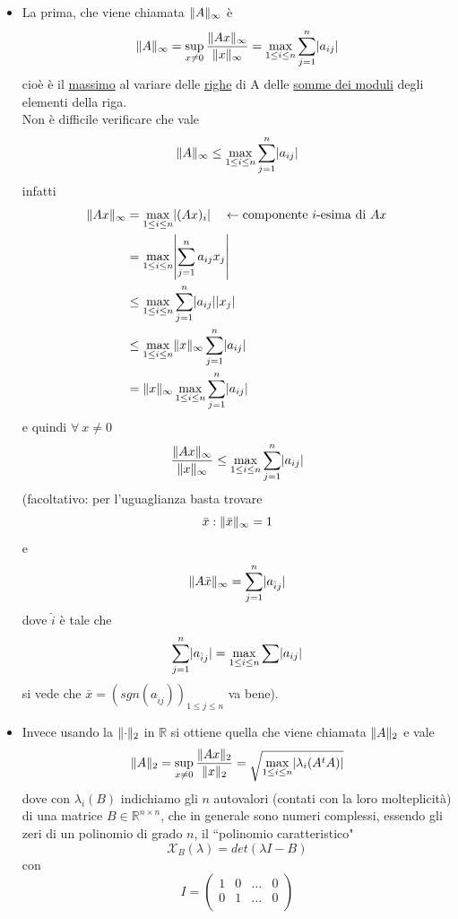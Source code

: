 \documentclass[12pt,a4paper]{article}
\DeclarePairedDelimiter{\abs}{\lvert}{\rvert}
\DeclarePairedDelimiter{\norma}{\lVert}{\rVert}
\begin{document}
\begin{itemize}
    \item La prima, che viene chiamata $\norma{A}_{\infty}$ è
    \[\norma{A}_{\infty} = \sup_{x \ne 0} \frac{\norma{Ax}_{\infty}}{\norma{x}_{\infty}} = \max_{1 \le i \le n} \sum_{j=1}^n \abs{a_{ij}}\]
    cioè è il \uline{massimo} al variare delle \uline{righe} di A delle \uline{somme dei moduli} degli elementi della riga.\\
    Non è difficile verificare che vale
    \[\norma{A}_{\infty} \le \max_{1 \le i \le n} \sum_{j=1}^n \abs{a_{ij}}\]
    infatti
    \[\begin{split}
        \norma{Ax}_{\infty} & = \max_{1 \le i \le n} \abs{(Ax)_i} \quad \leftarrow \text{componente } i\text{-esima di } Ax\\
        & = \max_{1 \le i \le n} \abs*{\sum_{j = 1}^n a_{ij}x_j} \\
        & \le \max_{1 \le i \le n} \sum_{j = 1}^n \abs{a_{ij}}\abs{x_j} \\
        & \le \max_{1 \le i \le n} \norma{x}_{\infty} \sum_{j = 1}^n \abs{a_{ij}} \\
        & = \norma{x}_{\infty} \max_{1 \le i \le n} \sum_{j = 1}^n \abs{a_{ij}}
    \end{split}\]
    e quindi $\forall \ x \ne 0$
    \[\frac{\norma{Ax}_{\infty}}{\norma{x}_{\infty}} \le \max_{1 \le i \le n} \sum_{j = 1}^n \abs{a_{ij}}\]
    (facoltativo: per l'uguaglianza basta trovare 
    \[\bar x : \norma{\bar x}_{\infty} = 1\] e 
    \[\norma{A \bar x}_{\infty} = \sum_{j = 1}^n \abs{a_{\hat{i}j}}\]
    dove $\hat{i}$ è tale che
    \[\sum_{j = 1}^n \abs{a_{\hat{i}j}} = \max_{1 \le i \le n} \sum \abs{a_{ij}}\]
    si vede che $\bar x = (sgn(a_{\hat{i}j}))_{1 \le j \le n}$ va bene).
    \item Invece usando la $\norma{\cdot}_2$ in $\mathbb{R}$ si ottiene quella che viene chiamata $\norma{A}_2$ e vale
    \[\norma{A}_2 = \sup_{x \ne 0} \frac{\norma{Ax}_2}{\norma{x}_2} = \sqrt{\max_{1 \le i \le n} \abs*{\lambda_i (A^t A)}}\]
    dove con $\lambda_i (B)$ indichiamo gli $n$ autovalori (contati con la loro molteplicità) di una matrice $B \in \mathbb{R}^{n \times n}$, che in generale sono numeri complessi, essendo gli zeri di un polinomio di grado $n$, il ``polinomio caratteristico"
    \[\mathcal{X}_B(\lambda) = det(\lambda I - B)\] con
    \[I = \begin{pmatrix}
        1 & 0 & \dotso & 0 \\
        0 & 1 & \dotso & 0 \\

\end{pmatrix}\]
\end{itemize}
\end{document}
